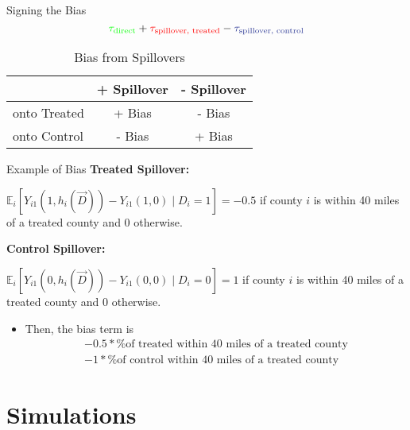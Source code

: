 \documentclass[aspectratio=43]{beamer}
\begin{document}
\begin{frame}{Signing the Bias}
    \[ 
        \textcolor{green}{\tau_{\text{direct}}} + \textcolor{red}{\tau_{\text{spillover, treated}}} - \textcolor{purple}{\tau_{\text{spillover, control}}}    
    \]

    \begin{table}
        \caption{Bias from Spillovers}
        \begin{tabular}{|l|cc|}
            \hline
            & + Spillover & - Spillover \\ \hline
            onto Treated & + Bias & - Bias \\
            onto Control & - Bias & + Bias \\
            \hline
        \end{tabular}
    \end{table}
\end{frame}

\begin{frame}{Example of Bias}
    \textbf{Treated Spillover:}
    
    $\mathbb{E}_i \left[ Y_{i1}(1, h_i(\vec{D})) - Y_{i1}(1, 0) \mid D_i = 1 \right] = -0.5$ if county $i$ is within 40 miles of a treated county and $0$ otherwise.
        
    \textbf{Control Spillover:}
    
    $\mathbb{E}_i \left[ Y_{i1}(0, h_i(\vec{D})) - Y_{i1}(0, 0) \mid D_i = 0 \right] = 1$ if county $i$ is within 40 miles of a treated county and $0$ otherwise.
        
    \begin{itemize}
        \item Then, the bias term is \begin{align*}
            -0.5 * \text{\% of treated within 40 miles of a treated county} \\
            -1 * \text{\% of control within 40 miles of a treated county}
        \end{align*}
    \end{itemize}
\end{frame}



\section{Simulations}
\end{document}
